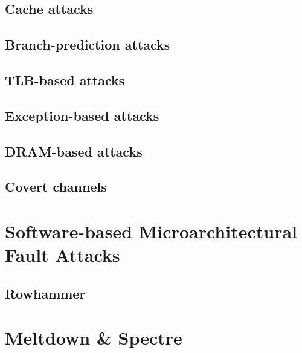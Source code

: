\documentclass[final, xcolor = table, usenames,%
dvipsnames, table, aspectratio = 169]{beamer}
\begin{document}
\subsection{Cache attacks}


\subsection{Branch-prediction attacks}


\subsection{TLB-based attacks}


\subsection{Exception-based attacks}


\subsection{DRAM-based attacks}


\subsection{Covert channels}



\section{Software-based Microarchitectural Fault Attacks}


\subsection{Rowhammer}



\section{Meltdown \& Spectre}
% 
\end{document}
